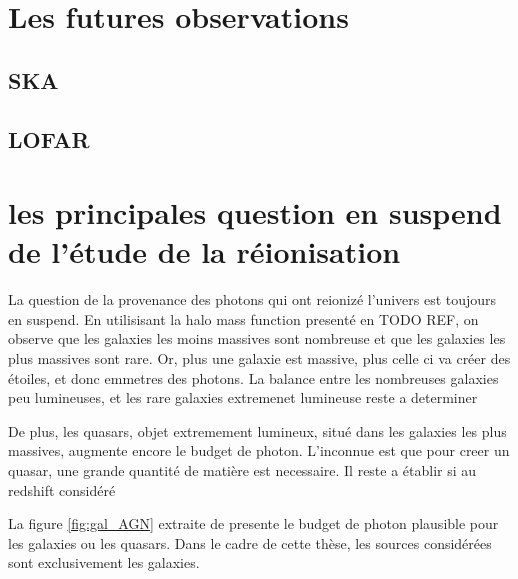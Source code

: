 %


\section{Les futures observations}
\subsection{SKA}
\subsection{LOFAR}





\section{les principales question en suspend de l'étude de la réionisation}


La question de la provenance des photons qui ont reionizé l'univers est toujours en suspend.
En utilisisant la halo mass function presenté en TODO REF, on observe que les galaxies les moins massives sont nombreuse et que les galaxies les plus massives sont rare.
Or, plus une galaxie est massive, plus celle ci va créer des étoiles, et donc emmetres des photons.
La balance entre les nombreuses galaxies peu lumineuses, et les rare galaxies extremenet lumineuse reste a determiner

De plus, les quasars, objet extremement lumineux, situé dans les galaxies les plus massives, augmente encore le budget de photon.
L'inconnue est que pour creer un quasar, une grande quantité de matière est necessaire.
Il reste a établir si au redshift considéré
\cite{chardin_large-scale_2017}


La figure \ref{fig:gal_AGN} extraite de \cite{trac_computer_2011} presente le budget de photon plausible pour les galaxies ou les quasars.
Dans le cadre de cette thèse, les sources considérées sont exclusivement les galaxies.

